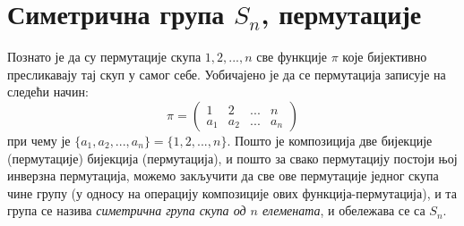 \documentclass{report}
\theoremstyle{plain}
\theoremstyle{definition}
\begin{document}
\section{Симетрична група $S_n$, пермутације}
Познато је да су пермутације скупа ${1, 2, ..., n}$ све функције $\pi$ које бијективно пресликавају тај скуп у самог себе. Уобичајено је да се пермутација записује на следећи начин:
$$\pi = \begin{pmatrix}
            1 & 2 & ... & n \\
            a_1 & a_2 & ... & a_n
        \end{pmatrix}$$
при чему је $\{a_1, a_2, ..., a_n\} = \{1, 2, ..., n\}$. Пошто је композиција две бијекције (пермутације) бијекција (пермутација), и пошто за свако пермутацију постоји њој инверзна пермутација, можемо закључити да све ове пермутације једног скупа чине групу (у односу на операцију композиције ових функција-пермутација), и та група се назива \emph{симетрична група скупа од $n$ елемената}, и обележава се са $S_n$.
\end{document}
